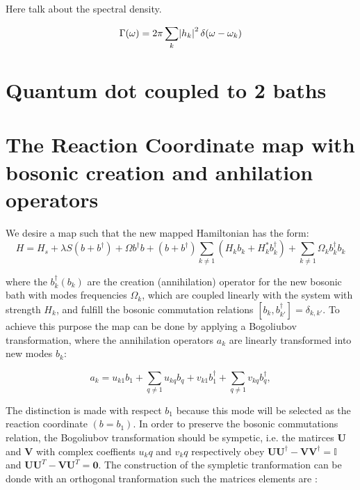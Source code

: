 \documentclass[12pt]{article}
\begin{document}
Here talk about the spectral density.

\begin{equation}
    \Gamma(\omega) = 2 \pi \sum_{k} \abs{h_k}^2 \delta(\omega-\omega_k)
\end{equation}

\section{Quantum dot coupled to 2 baths }

\section{The Reaction Coordinate map with bosonic creation and anhilation operators }

We desire a map such that the new mapped Hamiltonian has the form:
 \begin{equation}
H=H_s + \lambda S \left( b+ b^{\dagger} \right) +  \Omega b^{\dagger} b + (b+b^{\dagger}) \sum_{k \neq 1} \left( H_k b_k + H_k^* b_k^{\dagger} \right) + \sum_{k \neq 1} \Omega_k b_k^{\dagger} b_k   
\end{equation}

where  the $b_k^{\dagger} (b_k)$ are the  creation (annihilation) operator for the new bosonic bath with modes frequencies $\Omega_k$, which are coupled linearly with the  system with strength $H_k$, and fulfill the bosonic commutation relations $ [ b_k , b_{k'}^{\dagger} ] = \delta_{k,k'}  $. To achieve this purpose the map can be done by applying a Bogoliubov transformation, where the annihilation operators $a_k$ are linearly transformed into  new modes $b_k$: 

\begin{equation}
   a_k = u_{k1} b_1 +\sum_{q\neq 1} u_{kq} b_q + v_{k1} b_1^{\dagger}+ \sum_{q\neq 1} v_{kq} b_q^{\dagger},
\end{equation}

The distinction is made with respect $b_1$ because this mode will be selected as the reaction coordinate $(b=b_1)$. In order to preserve the bosonic commutations relation, the Bogoliubov transformation should be sympetic, i.e. the matirces $\mathbf{U}$  and $ \mathbf{V}$ with complex  coeffients $u_kq$ and  $v_kq$ respectively obey  $\mathbf{U}\mathbf{U}^{\dagger}- \mathbf{V}\mathbf{V}^{\dagger}= \mathbb{I}$ and $\mathbf{U}\mathbf{U}^T-\mathbf{V}\mathbf{U}^T= \mathbf{0} $. The construction of the sympletic tranformation can be donde with an orthogonal tranformation such the matrices elements are :
\end{document}

